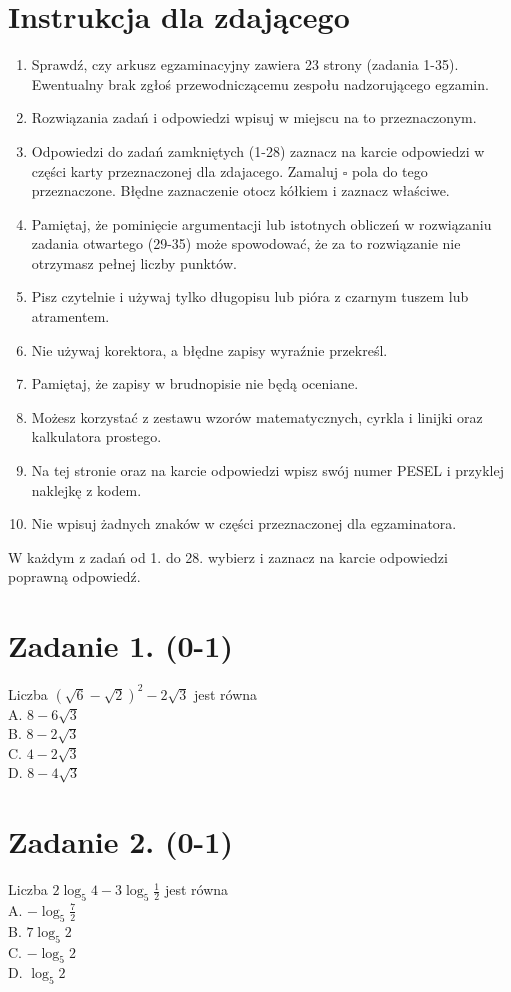 \documentclass[10pt]{article}
\begin{document}
\section*{Instrukcja dla zdającego}
\begin{enumerate}
  \item Sprawdź, czy arkusz egzaminacyjny zawiera 23 strony (zadania 1-35). Ewentualny brak zgłoś przewodniczącemu zespołu nadzorującego egzamin.
  \item Rozwiązania zadań i odpowiedzi wpisuj w miejscu na to przeznaczonym.
  \item Odpowiedzi do zadań zamkniętych (1-28) zaznacz na karcie odpowiedzi w części karty przeznaczonej dla zdajacego. Zamaluj \(\square\) pola do tego przeznaczone. Błędne zaznaczenie otocz kółkiem i zaznacz właściwe.
  \item Pamiętaj, że pominięcie argumentacji lub istotnych obliczeń w rozwiązaniu zadania otwartego (29-35) może spowodować, że za to rozwiązanie nie otrzymasz pełnej liczby punktów.
  \item Pisz czytelnie i używaj tylko długopisu lub pióra z czarnym tuszem lub atramentem.
  \item Nie używaj korektora, a błędne zapisy wyraźnie przekreśl.
  \item Pamiętaj, że zapisy w brudnopisie nie będą oceniane.
  \item Możesz korzystać z zestawu wzorów matematycznych, cyrkla i linijki oraz kalkulatora prostego.
  \item Na tej stronie oraz na karcie odpowiedzi wpisz swój numer PESEL i przyklej naklejkę z kodem.
  \item Nie wpisuj żadnych znaków w części przeznaczonej dla egzaminatora.
\end{enumerate}

W każdym z zadań od 1. do 28. wybierz i zaznacz na karcie odpowiedzi poprawną odpowiedź.

\section*{Zadanie 1. (0-1)}
Liczba \((\sqrt{6}-\sqrt{2})^{2}-2 \sqrt{3}\) jest równa\\
A. \(8-6 \sqrt{3}\)\\
B. \(8-2 \sqrt{3}\)\\
C. \(4-2 \sqrt{3}\)\\
D. \(8-4 \sqrt{3}\)

\section*{Zadanie 2. (0-1)}
Liczba \(2 \log _{5} 4-3 \log _{5} \frac{1}{2}\) jest równa\\
A. \(-\log _{5} \frac{7}{2}\)\\
B. \(7 \log _{5} 2\)\\
C. \(-\log _{5} 2\)\\
D. \(\log _{5} 2\)
\end{document}
